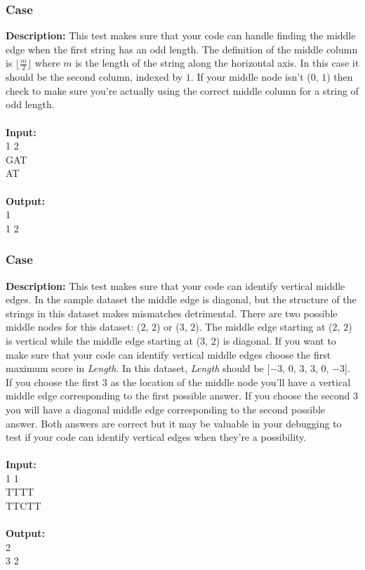 \documentclass{article}
\newcommand{\code}[1]{{\fontfamily{pcr}\selectfont #1}}
\begin{document}
\subsubsection*{Case }
\hline \vspace{5}
\textbf{Description:} This test makes sure that your code can handle finding the middle edge when the first string has an odd length. The definition of the middle column is $\lfloor\frac{m}{2}\rfloor$ where $m$ is the length of the string along the horizontal axis. In this case it should be the second column, indexed by $1$. If your middle node isn’t ($0$, $1$) then check to make sure you’re actually using the correct middle column for a string of odd length.\\ \\
\noindent \textbf{Input:}\\
\code{1 1 2\\GAT\\AT}\\ \\
\noindent \textbf{Output:}\\
\code{0 1\\1 2}

\subsubsection*{Case }
\hline \vspace{5}
\textbf{Description:} This test makes sure that your code can identify vertical middle edges. In the sample dataset the middle edge is diagonal, but the structure of the strings in this dataset makes mismatches detrimental. There are two possible middle nodes for this dataset: ($2$, $2$) or ($3$, $2$). The middle edge starting at ($2$, $2$) is vertical while the middle edge starting at ($3$, $2$) is diagonal. If you want to make sure that your code can identify vertical middle edges choose the first maximum score in \emph{Length}. In this dataset, \emph{Length} should be [$-3$, $0$, $3$, $3$, $0$, $-3$]. If you choose the first $3$ as the location of the middle node you’ll have a vertical middle edge corresponding to the first possible answer. If you choose the second $3$ you will have a diagonal middle edge corresponding to the second possible answer. Both answers are correct but it may be valuable in your debugging to test if your code can identify vertical edges when they’re a possibility.\\ \\
\noindent \textbf{Input:}\\
\code{1 1 1\\TTTT\\TTCTT}\\ \\
\noindent \textbf{Output:}\\
\code{2 2\\3 2}
\pagebreak
\end{document}
